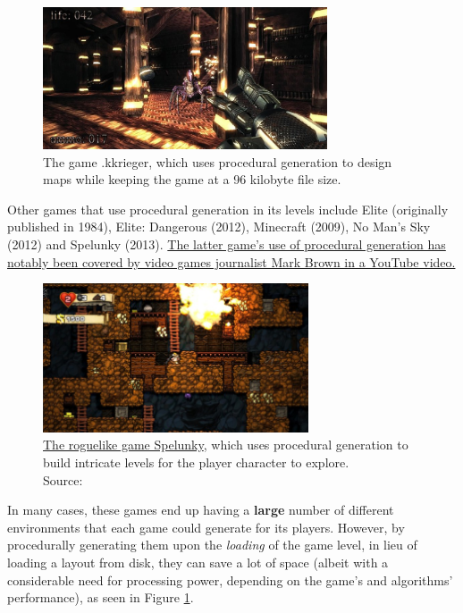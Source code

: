 \begin{figure}[H]
	\centering
	\includegraphics[width=0.75\textwidth]{Images/kkrieger.png}
	\caption{The game .kkrieger, which uses procedural generation to design maps while keeping the game at a 96 kilobyte file size.\cite{pcgvirtualworld}}
	\label{fig:kkrieger}
\end{figure}

Other games that use procedural generation in its levels include Elite (originally published in 1984), Elite: Dangerous (2012), Minecraft (2009), No Man's Sky (2012) and Spelunky (2013). \href{https://youtu.be/Uqk5Zf0tw3o}{The latter game's use of procedural generation has notably been covered by video games journalist Mark Brown in a YouTube video.}

\begin{figure}[H]
	\centering
	\includegraphics[width=0.7\textwidth]{Images/spelunky.jpg}
	\caption{\href{https://spelunkyworld.com/}{The roguelike game Spelunky}, which uses procedural generation to build intricate levels for the player character to explore.\\Source: }
	\label{fig:spelunky}
\end{figure}

In many cases, these games end up having a \textbf{large} number of different environments that each game could generate for its players. However, by procedurally generating them upon the \textit{loading} of the game level, in lieu of loading a layout from disk, they can save a lot of space (albeit with a considerable need for processing power, depending on the game's and algorithms' performance), as seen in Figure \ref{fig:kkrieger}.

